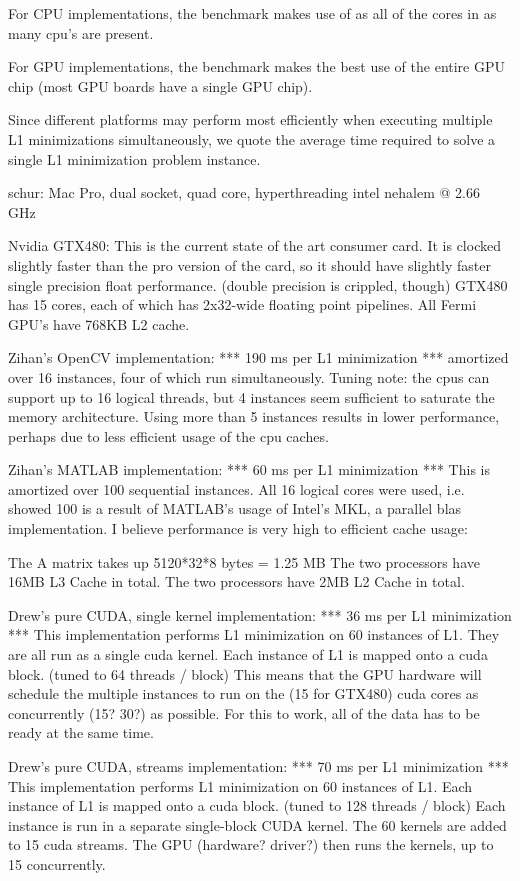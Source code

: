 \documentclass[10pt,twocolumn,letterpaper]{article}
\begin{document}
For CPU implementations, the benchmark makes use of
as all of the cores in as many cpu's are present.

For GPU implementations, the benchmark makes the best use
of the entire GPU chip (most GPU boards have a single GPU chip).

Since different platforms may perform most efficiently when
executing multiple L1 minimizations simultaneously,
we quote the average time required to solve a single L1
minimization problem instance.

schur:  Mac Pro, dual socket, quad core, hyperthreading intel nehalem @ 2.66 GHz

Nvidia GTX480: This is the current state of the art consumer card.  
It is clocked slightly faster than the pro version of the card, so it 
should have slightly faster single precision float performance. (double precision is crippled, though)
GTX480 has 15 cores, each of which has 2x32-wide floating point pipelines.
All Fermi GPU's have 768KB L2 cache.

Zihan's OpenCV implementation: *** 190 ms per L1 minimization ***
amortized over 16 instances,
four of which run simultaneously.  Tuning note:  the cpus
can support up to 16 logical threads, but 4 instances seem
sufficient to saturate the memory architecture.  Using more
than 5 instances results in lower performance, perhaps due
to less efficient usage of the cpu caches.

Zihan's MATLAB implementation: *** 60 ms per L1 minimization ***
This is amortized over 100 sequential instances.  All 16 logical
cores were used, i.e. showed 100%
is a result of MATLAB's usage of Intel's MKL, a parallel blas
implementation. I believe performance is very high to
efficient cache usage:

The A matrix takes up 5120*32*8 bytes = 1.25 MB
The two processors have 16MB L3 Cache in total.
The two processors have 2MB L2 Cache in total.

Drew's pure CUDA, single kernel implementation: *** 36 ms per L1 minimization ***
This implementation performs L1 minimization on 60 instances of L1.
They are all run as a single cuda kernel.  
Each instance of L1 is mapped onto a cuda block. (tuned to 64 threads / block)
This means that the GPU hardware will schedule the multiple instances to run
on the (15 for GTX480) cuda cores as concurrently (15? 30?) as possible.  
For this to work, all of the data has to be ready at the same time.

Drew's pure CUDA, streams implementation: *** 70 ms per L1 minimization ***
This implementation performs L1 minimization on 60 instances of L1.
Each instance of L1 is mapped onto a cuda block. (tuned to 128 threads / block)
Each instance is run in a separate single-block CUDA kernel.
The 60 kernels are added to 15 cuda streams.
The GPU (hardware? driver?) then runs the kernels, up to 15 concurrently.
\end{document}
